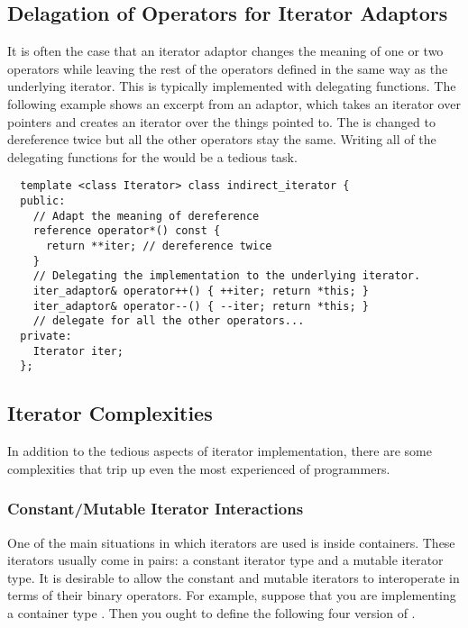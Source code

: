 \documentclass{netobjectdays}
\begin{document}


\subsection{Delagation of Operators for Iterator Adaptors}

It is often the case that an iterator adaptor changes the meaning of
one or two operators while leaving the rest of the operators defined
in the same way as the underlying iterator.  This is typically
implemented with delegating functions. The following example shows an
excerpt from an  adaptor, which takes an
iterator over pointers and creates an iterator over the things pointed
to. The  is changed to dereference twice but all the
other operators stay the same. Writing all of the delegating functions
for the  would be a tedious task.

{\footnotesize
\begin{verbatim}
  template <class Iterator> class indirect_iterator {
  public:
    // Adapt the meaning of dereference
    reference operator*() const {
      return **iter; // dereference twice
    }
    // Delegating the implementation to the underlying iterator.
    iter_adaptor& operator++() { ++iter; return *this; }
    iter_adaptor& operator--() { --iter; return *this; }
    // delegate for all the other operators...
  private:
    Iterator iter;
  };
\end{verbatim}
}

\subsection{Iterator Complexities}

In addition to the tedious aspects of iterator implementation, there
are some complexities that trip up even the most experienced of
programmers.

\subsubsection{Constant/Mutable Iterator Interactions}

One of the main situations in which iterators are used is inside
containers. These iterators usually come in pairs: a constant iterator
type and a mutable iterator type. It is desirable to allow the
constant and mutable iterators to interoperate in terms of their
binary operators. For example, suppose that you are implementing a
container type . Then you ought to define the following four
version of .
\end{document}
